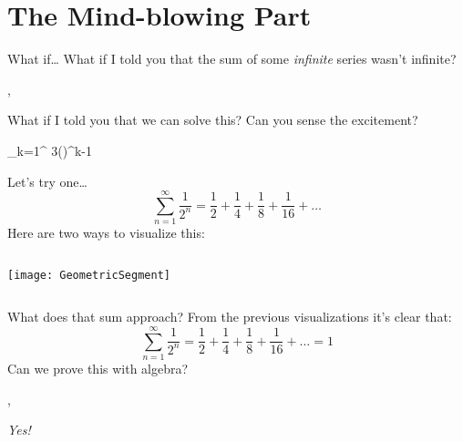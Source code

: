 	\section{The Mind-blowing Part}
	\begin{namedframe}{What if\dots}
		What if I told you that the sum of some \emph{infinite} series wasn't infinite?

		\sep

		What if I told you that we can solve this? Can you sense the excitement?

		\begin{sizedmath}{\Huge}
			\sum_{k=1}^{\infty} 3\left(\right)^{k-1}
		\end{sizedmath}
	\end{namedframe}
	\begin{namedframe}{Let's try one\dots}
		\[\sum_{n=1}^{\infty} \frac{1}{2^n} = \frac{1}{2} + \frac{1}{4} + \frac{1}{8} + \frac{1}{16} + \dots\]
		\pause
		Here are two ways to visualize this:
		\begin{columns}
			\begin{column}{0.5\textwidth}
				\texttt{[image: GeometricSegment]}
			\end{column}
			\begin{column}{0.5\textwidth}
			\end{column}
		\end{columns}
	\end{namedframe}
	\begin{namedframe}{What does that sum approach?}
		From the previous visualizations it's clear that:
		\[\sum_{n=1}^{\infty} \frac{1}{2^n} = \frac{1}{2} + \frac{1}{4} + \frac{1}{8} + \frac{1}{16} + \dots = 1\]
		Can we prove this with algebra?

		\sep

		\emph{Yes!}
	\end{namedframe}
